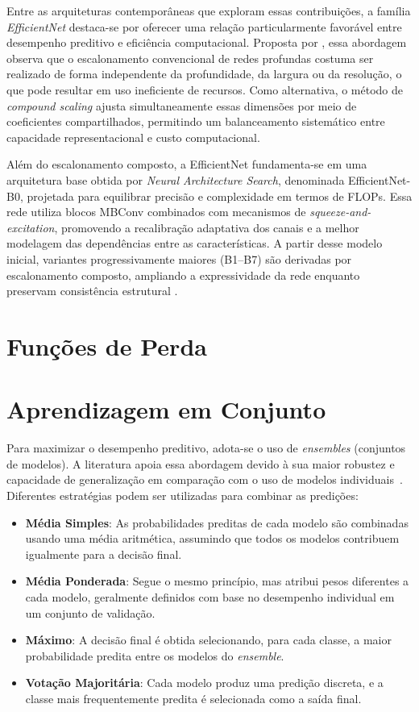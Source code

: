 Entre as arquiteturas contemporâneas que exploram essas contribuições, a família \textit{EfficientNet} destaca-se por oferecer uma relação particularmente favorável entre desempenho preditivo e eficiência computacional. Proposta por \cite{ref-tan2019}, essa abordagem observa que o escalonamento convencional de redes profundas costuma ser realizado de forma independente da profundidade, da largura ou da resolução, o que pode resultar em uso ineficiente de recursos. Como alternativa, o método de \textit{compound scaling} ajusta simultaneamente essas dimensões por meio de coeficientes compartilhados, permitindo um balanceamento sistemático entre capacidade representacional e custo computacional.

Além do escalonamento composto, a EfficientNet fundamenta-se em uma arquitetura base obtida por \textit{Neural Architecture Search}, denominada EfficientNet-B0, projetada para equilibrar precisão e complexidade em termos de FLOPs. Essa rede utiliza blocos MBConv combinados com mecanismos de \textit{squeeze-and-excitation}, promovendo a recalibração adaptativa dos canais e a melhor modelagem das dependências entre as características. A partir desse modelo inicial, variantes progressivamente maiores (B1–B7) são derivadas por escalonamento composto, ampliando a expressividade da rede enquanto preservam consistência estrutural \cite{ref-tan2019}.

\section{Funções de Perda}

\section{Aprendizagem em Conjunto}

Para maximizar o desempenho preditivo, adota-se o uso de \textit{ensembles} (conjuntos de modelos). A literatura apoia essa abordagem devido à sua maior robustez e capacidade de generalização em comparação com o uso de modelos individuais~\cite{mian2024ensemble}. Diferentes estratégias podem ser utilizadas para combinar as predições:

\begin{itemize}
    \item \textbf{Média Simples}: As probabilidades preditas de cada modelo são combinadas usando uma média aritmética, assumindo que todos os modelos contribuem igualmente para a decisão final.
    \item \textbf{Média Ponderada}: Segue o mesmo princípio, mas atribui pesos diferentes a cada modelo, geralmente definidos com base no desempenho individual em um conjunto de validação.
    \item \textbf{Máximo}: A decisão final é obtida selecionando, para cada classe, a maior probabilidade predita entre os modelos do \textit{ensemble}.
    \item \textbf{Votação Majoritária}: Cada modelo produz uma predição discreta, e a classe mais frequentemente predita é selecionada como a saída final.
\end{itemize}

